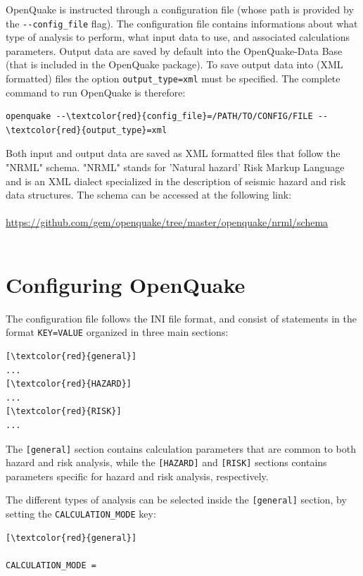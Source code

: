 OpenQuake is instructed through a configuration file (whose path is provided by the \Verb+--config_file+ flag). The configuration file contains informations about what type of analysis to perform, what input data to use, and associated calculations parameters. Output data are saved by default into the OpenQuake-Data Base (that is included in the OpenQuake package). To save output data into (XML formatted) files the option \Verb+output_type=xml+ must be specified. The complete command to run OpenQuake is therefore:
\begin{Verbatim}[frame=single, commandchars=\\\{\}, samepage=true]
openquake --\textcolor{red}{config_file}=/PATH/TO/CONFIG/FILE --\textcolor{red}{output_type}=xml
\end{Verbatim}
Both input and output data are saved as XML formatted files that follow the "NRML" schema. "NRML" stands for 'Natural hazard' Risk Markup Language and is an XML dialect specialized in the description of seismic hazard and risk data structures. The schema can be accessed at the following link: \\ \\
 \href{https://github.com/gem/openquake/tree/master/openquake/nrml/schema}
{https://github.com/gem/openquake/tree/master/openquake/nrml/schema}\\ \\ 


\section{Configuring OpenQuake}
The configuration file follows the INI file format, and consist of statements in the format \Verb+KEY=VALUE+ organized in three main sections:
\begin{Verbatim}[frame=single, commandchars=\\\{\}, samepage=true]
[\textcolor{red}{general}]
...
[\textcolor{red}{HAZARD}]
...
[\textcolor{red}{RISK}]
...
\end{Verbatim}
 
The \Verb+[general]+ section contains calculation parameters that are common to both hazard and risk analysis, while the \Verb+[HAZARD]+ and \Verb+[RISK]+ sections contains parameters specific for hazard and risk analysis, respectively.

The different types of analysis can be selected inside the \Verb+[general]+ section, by setting  the \Verb+CALCULATION_MODE+ key:
\begin{Verbatim}[frame=single, commandchars=\\\{\}, samepage=true]
[\textcolor{red}{general}]

CALCULATION_MODE =
\end{Verbatim}

